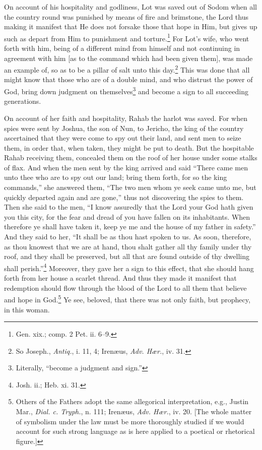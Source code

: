 
On account of his hospitality and godliness, Lot was saved out of Sodom when all the country round was punished by means of fire and brimstone, the Lord thus making it manifest that He does not forsake those that hope in Him, but gives up such as depart from Him to punishment and torture.\footnote{Gen. xix.; comp. 2 Pet. ii. 6–9.} For Lot’s wife, who went forth with him, being of a different mind from himself and not continuing in agreement with him [as to the command which had been given them], was made an example of, so as to be a pillar of salt unto this day.\footnote{So Joseph., \emph{Antiq.}, i. 11, 4; Irenæus, \emph{Adv. Hær.}, iv. 31.} This was done that all might know that those who are of a double mind, and who distrust the power of God, bring down judgment on themselves\footnote{Literally, “become a judgment and sign.”} and become a sign to all succeeding generations.


On account of her faith and hospitality, Rahab the harlot was saved. For when spies were sent by Joshua, the son of Nun, to Jericho, the king of the country ascertained that they were come to spy out their land, and sent men to seize them, in order that, when taken, they might be put to death. But the hospitable Rahab receiving them, concealed them on the roof of her house under some stalks of flax. And when the men sent by the king arrived and said “There came men unto thee who are to spy out our land; bring them forth, for so the king commands,” she answered them, “The two men whom ye seek came unto me, but quickly departed again and are gone,” thus not discovering the spies to them. Then she said to the men, “I know assuredly that the Lord your God hath given you this city, for the fear and dread of you have fallen on its inhabitants. When therefore ye shall have taken it, keep ye me and the house of my father in safety.” And they said to her, “It shall be as thou hast spoken to us. As soon, therefore, as thou knowest that we are at hand, thou shalt gather all thy family under thy roof, and they shall be preserved, but all that are found outside of thy dwelling shall perish.”\footnote{Josh. ii.; Heb. xi. 31.} Moreover, they gave her a sign to this effect, that she should hang forth from her house a scarlet thread. And thus they made it manifest that redemption should flow through the blood of the Lord to all them that believe and hope in God.\footnote{Others of the Fathers adopt the same allegorical interpretation, e.g., Justin Mar., \emph{Dial. c. Tryph.}, n. 111; Irenæus, \emph{Adv. Hær.}, iv. 20. [The whole matter of symbolism under the law must be more thoroughly studied if we would account for such strong language as is here applied to a poetical or rhetorical figure.]} Ye see, beloved, that there was not only faith, but prophecy, in this woman.

